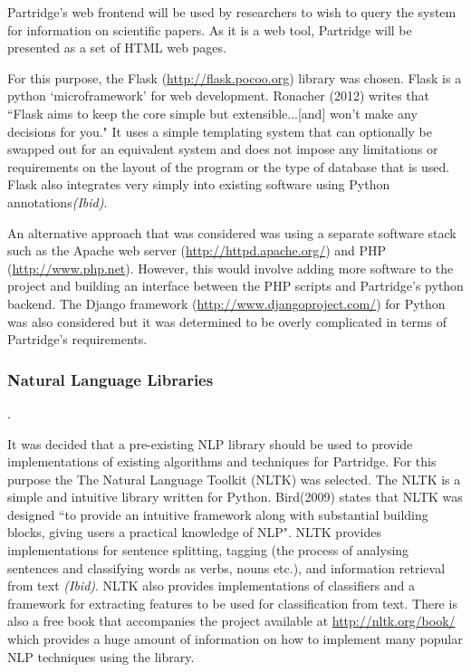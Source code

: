 \documentclass[12pt,a4paper]{article}
\begin{document}
Partridge's web frontend will be used by researchers to wish to query the
system for information on scientific papers. As it is a web tool, Partridge
will be presented as a set of HTML web pages.

For this purpose, the Flask (\url{http://flask.pocoo.org}) library was chosen.
Flask is a python `microframework' for web development. Ronacher (2012) writes
that ``Flask aims to keep the core simple but extensible...[and] won't make any
decisions for you\cite{flask2012}." It uses a simple templating system that can
optionally be swapped out for an equivalent system and does not impose any
limitations or requirements on the layout of the program or the type of
database that is used. Flask also integrates very simply into existing software
using Python annotations\emph{(Ibid)}. 

An alternative approach that was considered was using a separate software
stack such as the Apache web server (\url{http://httpd.apache.org/}) and PHP 
(\url{http://www.php.net}). However, this would involve adding more software to the
project and building an interface between the PHP scripts and Partridge's
python backend. The Django framework (\url{http://www.djangoproject.com/}) for Python was also
considered but it was determined to be overly complicated in terms of
Partridge's requirements.

\subsubsection{Natural Language Libraries} \label{sec:libschoice}.  

It was decided that a pre-existing NLP library should be used to provide
implementations of existing algorithms and techniques for Partridge. For this
purpose the The Natural Language Toolkit (NLTK) was selected. The NLTK is a
simple and intuitive library written for Python. Bird(2009) states that NLTK
was designed ``to provide an intuitive framework along with substantial
building blocks, giving users a practical knowledge of
NLP\cite{bird2009natural}". NLTK provides implementations for sentence
splitting, tagging (the process of analysing sentences and classifying words as
verbs, nouns etc.), and information retrieval from text \emph{(Ibid)}. NLTK
also provides implementations of classifiers and a framework for extracting
features to be used for classification from text. There is also a free book
that accompanies the project available at \url{http://nltk.org/book/} which
provides a huge amount of information on how to implement many popular NLP
techniques using the library.
\end{document}
